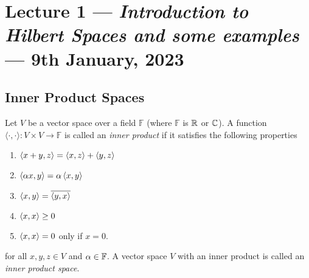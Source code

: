 \section{Lecture 1  --- \textit{Introduction to Hilbert Spaces and some examples} --- 9th January, 2023}

\subsection{Inner Product Spaces}
\begin{definition}
    Let $V$ be a vector space over a field $\mathbb F$ (where $\mathbb F$ is $\mathbb R$ or $\mathbb C$). A function $\langle \cdot , \cdot \rangle : V \times V \to \mathbb F$ is called an \textit{inner product} if it satisfies the following properties
    \begin{enumerate}
	\item $\left\langle x+y, z \right\rangle = \left\langle x, z \right\rangle + \left\langle y, z \right\rangle$
	\item $\left\langle \alpha x, y \right\rangle = \alpha \left\langle x, y \right\rangle$
	\item $\left\langle x, y \right\rangle = \overline{\left\langle y, x \right\rangle}$
	\item $\left\langle x, x \right\rangle \ge 0$ 
	\item  $\left\langle x, x \right\rangle = 0$ only if $x=0.$
    \end{enumerate}
    for all $x,y,z \in V$ and $\alpha \in \mathbb F$. A vector space $V$ with an inner product is called an \textit{inner product space}.
    \label{def:inner-product}
\end{definition}

